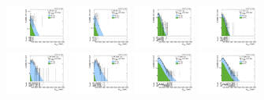 \begin{figure}[htbp]
  \centering
  \includegraphics[width=0.18\textwidth]{fig/fitValidation/PostFit_SR_MVV_MJJ150to210__mu_HP_bb_LDy_Run2.pdf}
  \includegraphics[width=0.18\textwidth]{fig/fitValidation/PostFit_SR_MVV_MJJ150to210__e_HP_bb_LDy_Run2.pdf}
  \includegraphics[width=0.18\textwidth]{fig/fitValidation/PostFit_SR_MVV_MJJ150to210__mu_LP_bb_LDy_Run2.pdf}
  \includegraphics[width=0.18\textwidth]{fig/fitValidation/PostFit_SR_MVV_MJJ150to210__e_LP_bb_LDy_Run2.pdf}\\
  \includegraphics[width=0.18\textwidth]{fig/fitValidation/PostFit_SR_MVV_MJJ150to210__mu_HP_nobb_LDy_Run2.pdf}
  \includegraphics[width=0.18\textwidth]{fig/fitValidation/PostFit_SR_MVV_MJJ150to210__e_HP_nobb_LDy_Run2.pdf}
  \includegraphics[width=0.18\textwidth]{fig/fitValidation/PostFit_SR_MVV_MJJ150to210__mu_LP_nobb_LDy_Run2.pdf}
  \includegraphics[width=0.18\textwidth]{fig/fitValidation/PostFit_SR_MVV_MJJ150to210__e_LP_nobb_LDy_Run2.pdf}\\

\end{figure}
